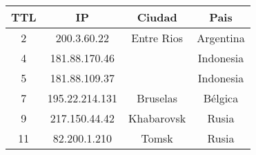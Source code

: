 \begin{tabular}{|c|c|c|c|}
	\hline
	TTL & IP & Ciudad & Pais \\
	\hline
	2 & 200.3.60.22 & Entre Rios & Argentina \\
	\hline
	4 & 181.88.170.46 & & Indonesia \\
	\hline
	5 & 181.88.109.37 & & Indonesia \\
	\hline
	7 & 195.22.214.131 & Bruselas & Bélgica \\
	\hline
	9 & 217.150.44.42 & Khabarovsk & Rusia \\
	\hline
	11 & 82.200.1.210 & Tomsk & Rusia \\
	\hline
\end{tabular}
